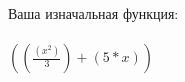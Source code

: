 \documentclass[12pt,a4paper]{scrartcl}
\begin{document}
\\\\Ваша изначальная функция: \\
\\{${({(\frac{({x}^{2})}{3})}+{({5}*{x})})}$}
\end{document}
